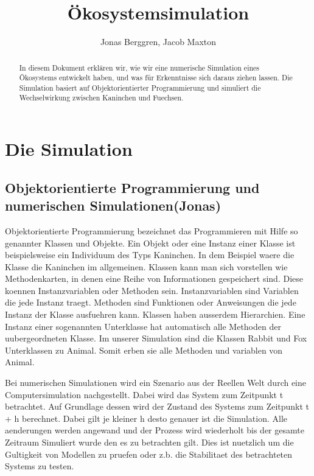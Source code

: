 \documentclass[12pt]{article}
\author{{\Large Jonas Berggren, Jacob Maxton}}
\title{{\myfont Ökosystemsimulation}}
\begin{document}
\maketitle
\begin{abstract}
In diesem Dokument erklären wir, wie wir eine numerische Simulation eines
	Ökosystems entwickelt haben, und was für Erkenntnisse sich daraus ziehen lassen.
Die Simulation basiert auf Objektorientierter Programmierung und simuliert die Wechselwirkung zwischen Kaninchen und Fuechsen.
\end{abstract}
\tableofcontents
\newpage
\section{Die Simulation}
 \subsection{Objektorientierte Programmierung und numerischen Simulationen(Jonas)}
Objektorientierte Programmierung bezeichnet das Programmieren mit Hilfe so genannter Klassen und Objekte.
Ein Objekt oder eine Instanz einer Klasse ist beispielsweise ein Individuum des Typs Kaninchen.
In dem Beispiel waere die Klasse die Kaninchen im allgemeinen.
Klassen kann man sich vorstellen wie Methodenkarten, in denen eine Reihe von Informationen gespeichert sind.
Diese koennen Instanzvariablen oder Methoden sein.
Instanzvariablen sind Variablen die jede Instanz traegt.
Methoden sind Funktionen oder Anweisungen die jede Instanz der Klasse ausfuehren kann.
Klassen haben ausserdem Hierarchien.
Eine Instanz einer sogenannten Unterklasse hat automatisch alle Methoden der uubergeordneten Klasse.
Im unserer Simulation sind die Klassen \colorbox{gray!40}{Rabbit} und
\colorbox{gray!40}{Fox} Unterklassen zu \colorbox{gray!40}{Animal}.
Somit erben sie alle Methoden und variablen von \colorbox{gray!40}{Animal}.

Bei numerischen Simulationen wird ein Szenario aus der Reellen Welt durch eine Computersimulation nachgestellt.
Dabei wird das System zum Zeitpunkt t betrachtet.
Auf Grundlage dessen wird der Zustand des Systems zum Zeitpunkt t + h berechnet.
Dabei gilt je kleiner h desto genauer ist die Simulation.
Alle aenderungen werden angewand und der Prozess wird wiederholt bis der gesamte Zeitraum Simuliert wurde den es zu betrachten gilt.
Dies ist nuetzlich um die Gultigkeit von Modellen zu pruefen oder z.b. die Stabilitaet des betrachteten Systems zu testen.
\end{document}
